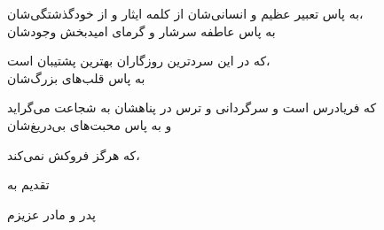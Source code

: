 \thispagestyle{empty}
\vspace{4cm}

{\IranNastaliq
{\small	
\noindent به پاس تعبیر عظیم و انسانی‌شان از کلمه ایثار و از خودگذشتگی‌شان،\\
\hspace*{.5cm} به پاس عاطفه سرشار و گرمای امیدبخش وجودشان 

\hspace*{1cm} که در این سردترین روزگاران بهترین پشتیبان است،\\ 
به پاس قلب‌های بزرگ‌شان 

\hspace*{.5cm} که فریادرس است و سرگردانی و ترس در پناهشان به شجاعت می‌گراید \\
و به پاس محبت‌های بی‌دریغ‌شان 

\hspace*{.5cm} که هرگز فروکش نمی‌کند،

\vspace{1cm}
\Large
تقدیم به

\vspace{1.5cm}
\LARGE
\centerline{پدر و مادر عزیزم}
}}
\newpage